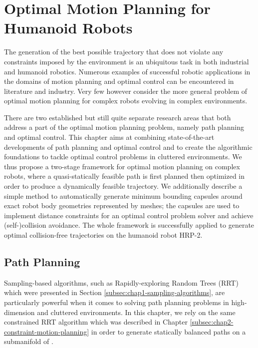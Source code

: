 \chapter{Optimal Motion Planning for Humanoid Robots}
\label{chap:optimal-motion-planning}

The generation of the best possible trajectory that does not violate
any constraints imposed by the environment is an ubiquitous task in
both industrial and humanoid robotics. Numerous examples of successful
robotic applications in the domains of motion planning and optimal
control can be encountered in literature and industry. Very few
however consider the more general problem of optimal motion planning
for complex robots evolving in complex environments.

There are two established but still quite separate research areas that
both address a part of the optimal motion planning problem, namely
path planning and optimal control. This chapter aims at combining
state-of-the-art developments of path planning and optimal control and
to create the algorithmic foundations to tackle optimal control
problems in cluttered environments. We thus propose a two-stage
framework for optimal motion planning on complex robots, where a
quasi-statically feasible path is first planned then optimized in
order to produce a dynamically feasible trajectory. We additionally
describe a simple method to automatically generate minimum bounding
capsules around exact robot body geometries represented by meshes; the
capsules are used to implement distance constraints for an optimal
control problem solver and achieve (self-)collision avoidance. The
whole framework is successfully applied to generate optimal
collision-free trajectories on the humanoid robot HRP-2.

\section{Path Planning}

Sampling-based algorithms, such as Rapidly-exploring Random Trees
(RRT) which were presented in Section
\ref{subsec:chap1-sampling-algorithms}, are particularly powerful when
it comes to solving path planning problems in
high-dimension {\cspace}\thinspace and cluttered environments. In this
chapter, we rely on the same constrained RRT algorithm which was
described in Chapter \ref{subsec:chap2-constraint-motion-planning} in
order to generate statically balanced paths on a submanifold
of {\cspace}.

